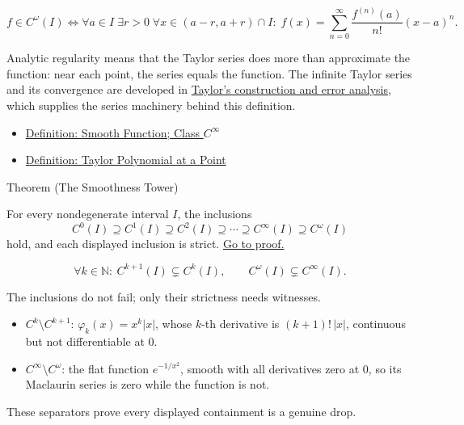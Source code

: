 \begin{remark*}
\[
  f\in C^\omega(I)
  \Longleftrightarrow
  \forall a\in I\;\exists r>0\;\forall x\in(a-r,a+r)\cap I:\;
  f(x)=\sum_{n=0}^{\infty}\frac{f^{(n)}(a)}{n!}(x-a)^n.
\]
\end{remark*}

\begin{remark*}[Interpretation]
Analytic regularity means that the Taylor series does more than approximate the function: near each point, the series equals the function. The infinite Taylor series and its convergence are developed in \hyperref[def:taylor-polynomial-at-a-point]{Taylor's construction and error analysis}, which supplies the series machinery behind this definition.
\end{remark*}

\begin{dependencies}
\begin{itemize}
  \item \hyperref[def:class-cinfty]{Definition: Smooth Function; Class \(C^\infty\)}
  \item \hyperref[def:taylor-polynomial-at-a-point]{Definition: Taylor Polynomial at a Point}
\end{itemize}
\end{dependencies}

\begin{theorembox}{Theorem (The Smoothness Tower)}
\begin{theorem}
\label{thm:smoothness-tower}
For every nondegenerate interval \(I\), the inclusions
\[
  C^0(I)\supseteq C^1(I)\supseteq C^2(I)\supseteq \cdots
  \supseteq C^\infty(I)\supseteq C^\omega(I)
\]
hold, and each displayed inclusion is strict.
\hyperref[prf:smoothness-tower]{Go to proof.}
\end{theorem}
\end{theorembox}

\begin{remark*}
\[
  \forall k\in\mathbb{N}:\ C^{k+1}(I)\subsetneq C^k(I),
  \qquad
  C^\omega(I)\subsetneq C^\infty(I).
\]
\end{remark*}

\begin{remark*}
The inclusions do not fail; only their strictness needs witnesses.
\begin{itemize}
  \item \(C^k\setminus C^{k+1}\): \(\varphi_k(x)=x^k|x|\), whose \(k\)-th
        derivative is \((k+1)!\,|x|\), continuous but not differentiable at
        \(0\).
  \item \(C^\infty\setminus C^\omega\): the flat function
        \(e^{-1/x^2}\), smooth with all derivatives zero at \(0\), so its
        Maclaurin series is zero while the function is not.
\end{itemize}
These separators prove every displayed containment is a genuine drop.
\end{remark*}

